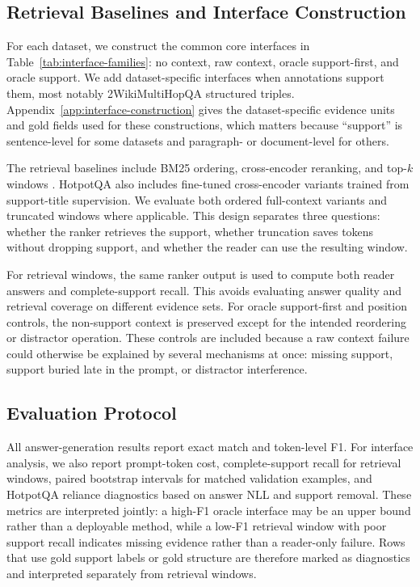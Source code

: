\documentclass[a4paper,fleqn]{cas-sc}
\begin{document}
\subsection{Retrieval Baselines and Interface Construction}

For each dataset, we construct the common core interfaces in
Table~\ref{tab:interface-families}: no context, raw context, oracle
support-first, and oracle support. We add dataset-specific interfaces when
annotations support them, most notably 2WikiMultiHopQA structured triples.
Appendix~\ref{app:interface-construction} gives the dataset-specific evidence
units and gold fields used for these constructions, which matters because
``support'' is sentence-level for some datasets and paragraph- or
document-level for others.

The retrieval baselines include BM25 ordering, cross-encoder reranking, and
top-$k$ windows \citep{robertson2009bm25,nogueira2019bert}. HotpotQA also
includes fine-tuned cross-encoder variants trained from support-title
supervision. We evaluate both ordered full-context variants and truncated
windows where applicable. This design separates three questions: whether the
ranker retrieves the support, whether truncation saves tokens without dropping
support, and whether the reader can use the resulting window.

For retrieval windows, the same ranker output is used to compute both reader
answers and complete-support recall. This avoids evaluating answer quality and
retrieval coverage on different evidence sets. For oracle support-first and
position controls, the non-support context is preserved except for the intended
reordering or distractor operation. These controls are included because a raw
context failure could otherwise be explained by several mechanisms at once:
missing support, support buried late in the prompt, or distractor interference.

\subsection{Evaluation Protocol}

All answer-generation results report exact match and token-level F1. For
interface analysis, we also report prompt-token cost, complete-support recall
for retrieval windows, paired bootstrap intervals for matched validation
examples, and HotpotQA reliance diagnostics based on answer NLL and support
removal. These metrics are interpreted jointly: a high-F1 oracle interface may
be an upper bound rather than a deployable method, while a low-F1 retrieval
window with poor support recall indicates missing evidence rather than a
reader-only failure. Rows that use gold support labels or gold structure are
therefore marked as diagnostics and interpreted separately from retrieval
windows.
\end{document}
